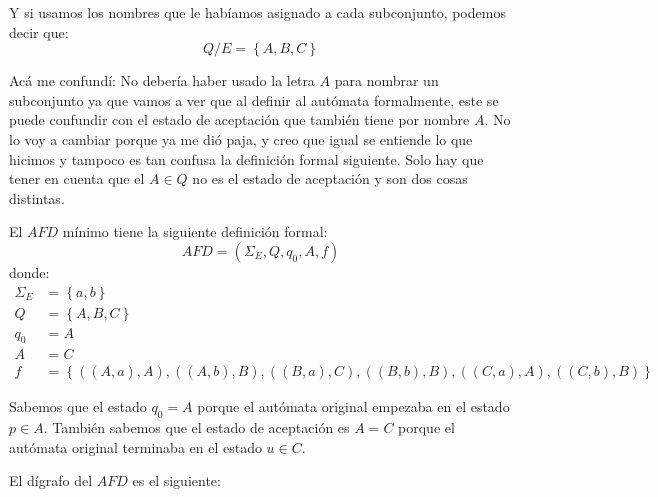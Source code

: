 \documentclass[12pt]{article}
\begin{document}
Y si usamos los nombres que le habíamos asignado a cada subconjunto, podemos decir que:
\[
Q/E = \left\{A,B,C\right\}
\]

Acá me confundí: No debería haber usado la letra $ A $ para nombrar un subconjunto ya que vamos a ver que al definir al autómata formalmente, este se puede confundir con el estado de aceptación que también tiene por nombre $ A $. No lo voy a cambiar porque ya me dió paja, y creo que igual se entiende lo que hicimos y tampoco es tan confusa la definición formal siguiente. Solo hay que tener en cuenta que el $ A \in Q $ no es el estado de aceptación y son dos cosas distintas.

El $ AFD $ mínimo tiene la siguiente definición formal:
\[
AFD = \left(\Sigma_{E},Q,q_{0},A,f\right)
\]
donde:
\begin{align*}
  \Sigma_{E} &= \left\{a,b\right\}\\
  Q &= \left\{A,B,C\right\}\\
  q_{0} &= A\\
  A &= C\\
  f &= \left\{((A,a),A),((A,b),B),((B,a),C),((B,b),B),((C,a),A),((C,b),B)\right\}
\end{align*}

Sabemos que el estado $ q_{0} = A $ porque el autómata original empezaba en el estado $ p \in A $. También sabemos que el estado de aceptación es $ A = C $ porque el autómata original terminaba en el estado $ u \in C $.

El dígrafo del $ AFD $ es el siguiente:
\begin{center}
\end{center}
\end{document}
